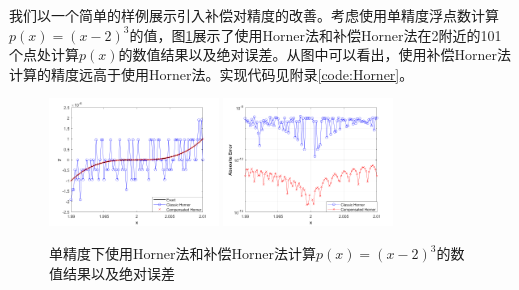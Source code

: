 \documentclass[a4paper,10pt]{ctexart}
\begin{document}
我们以一个简单的样例展示引入补偿对精度的改善。考虑使用单精度浮点数计算$ p(x) = (x-2)^3 $的值，图\ref{fig:Horner}展示了使用Horner法和补偿Horner法在2附近的101个点处计算$ p(x) $的数值结果以及绝对误差。从图中可以看出，使用补偿Horner法计算的精度远高于使用Horner法。实现代码见附录\ref{code:Horner}。
\begin{figure}
    \centering
    \includegraphics[width=0.4\textwidth]{polybyHorner.png}
    \hspace{1in}
    \includegraphics[width=0.4\textwidth]{ErrorbyHorner.png}
    \caption{单精度下使用Horner法和补偿Horner法计算$ p(x) = (x-2)^3 $的数值结果以及绝对误差}
    \label{fig:Horner}
\end{figure}
\end{document}
